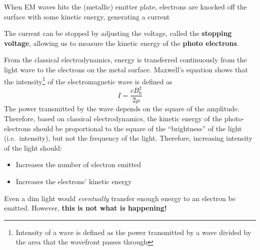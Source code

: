 When EM waves hits the (metallic) emitter plate, electrons are knocked
off the surface with some kinetic energy, generating a current
\begin{center}
\end{center}
The current can be stopped by adjusting the voltage, called the
\textbf{stopping voltage}, allowing us to measure the kinetic energy of the
\textbf{photo electrons}.

From the classical electrodynamics, energy is transferred continuously from the
light wave to the electrons on the metal surface. Maxwell's equation shows that
the intensity\footnote{Intensity of a wave is defined as the power transmitted
by a wave divided by the area that the wavefront passes through} of the
electromagnetic wave is defined as
\begin{equation*}
  I=\frac{cB_0^2}{2\mu}
\end{equation*}
The power transmitted by the wave depends on the square of the amplitude.
Therefore, based on classical electrodynamics, the kinetic energy of the
photo-electrons should be proportional to the square of the ``brightness''
of the light (i.e.\ intensity), but not the frequency of the light. Therefore,
increasing intensity of the light should:
\begin{itemize}
\item Increases the number of electron emitted
\item Increases the electrons' kinetic energy
\end{itemize}
Even a dim light would \emph{eventually} transfer enough energy to an electron
be emitted. However, \textbf{this is not what is happening!}

